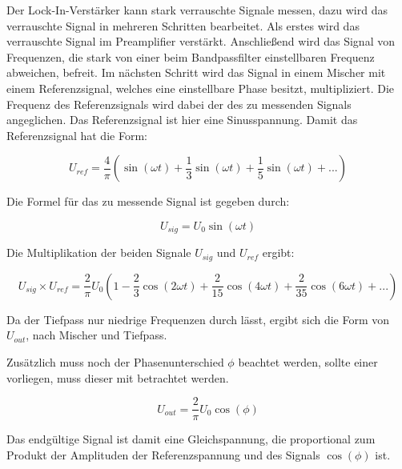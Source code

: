 Der Lock-In-Verstärker kann stark verrauschte Signale messen, dazu wird das verrauschte Signal in mehreren Schritten bearbeitet. Als erstes wird das verrauschte Signal im Preamplifier verstärkt. Anschließend wird das Signal von Frequenzen, die stark von einer beim Bandpassfilter einstellbaren Frequenz abweichen, befreit.
Im nächsten Schritt wird das Signal in einem Mischer mit einem
Referenzsignal, welches eine einstellbare Phase besitzt, multipliziert. Die Frequenz des Referenzsignals wird dabei der des zu messenden Signals angeglichen. Das Referenzsignal ist hier eine Sinusspannung. 
Damit das Referenzsignal hat die Form:

\begin{equation}
  \label{eq:ref}
  U_{ref} = \frac{4}{\pi} \left( \sin(\omega t) + \frac{1}{3} \sin(\omega t) + \frac{1}{5} \sin(\omega t) + ... \right)
\end{equation}

Die Formel für das zu messende Signal ist gegeben durch:

\begin{equation}
  \label{eq:sig}
  U_{sig} = U_{0} \sin(\omega t)
\end{equation}

Die Multiplikation der beiden Signale $U_{sig}$ und $U_{ref}$ ergibt:

\begin{equation*}
  U_{sig} \times U_{ref} = \frac{2}{\pi} U_{0} \left(1 - \frac{2}{3} \cos(2\omega t) + \frac{2}{15} \cos(4\omega t) + \frac{2}{35} \cos(6\omega t) + ... \right)
\end{equation*}

Da der Tiefpass nur niedrige Frequenzen durch lässt, ergibt sich die Form von $U_{out}$, nach Mischer und Tiefpass.

Zusätzlich muss noch der Phasenunterschied $\phi$ beachtet werden, sollte einer vorliegen, muss dieser mit betrachtet werden.

\begin{equation}
  \label{eq:Uout}
   U_{out} = \frac{2}{\pi} U_{0} \cos(\phi)
\end{equation}

Das endgültige Signal ist damit eine Gleichspannung, die proportional zum
Produkt der Amplituden der Referenzspannung und des Signals $\cos(\phi)$ ist.
